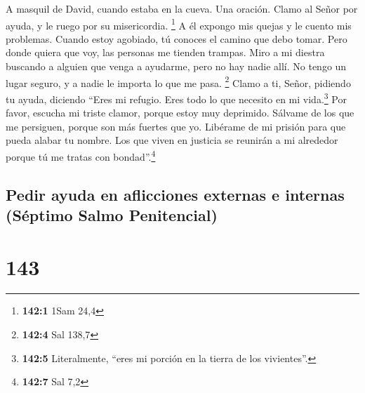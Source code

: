 A masquil de David, cuando estaba en la cueva. Una oración.
 Clamo al Señor por ayuda, y le ruego por su misericordia.
\footnote{\textbf{142:1} 1Sam 24,4}  A él expongo mis
quejas y le cuento mis problemas.  Cuando estoy agobiado,
tú conoces el camino que debo tomar. Pero donde quiera que voy, las
personas me tienden trampas.  Miro a mi diestra buscando a
alguien que venga a ayudarme, pero no hay nadie allí. No tengo un lugar
seguro, y a nadie le importa lo que me pasa. \footnote{\textbf{142:4}
  Sal 138,7}  Clamo a ti, Señor, pidiendo tu ayuda,
diciendo ``Eres mi refugio. Eres todo lo que necesito en mi
vida.\footnote{\textbf{142:5} Literalmente, ``eres mi porción en la
  tierra de los vivientes''.}  Por favor, escucha mi
triste clamor, porque estoy muy deprimido. Sálvame de los que me
persiguen, porque son más fuertes que yo.  Libérame de mi
prisión para que pueda alabar tu nombre. Los que viven en justicia se
reunirán a mi alrededor porque tú me tratas con bondad''.\footnote{\textbf{142:7}
  Sal 7,2}

\hypertarget{pedir-ayuda-en-aflicciones-externas-e-internas-suxe9ptimo-salmo-penitencial}{%
\subsection{Pedir ayuda en aflicciones externas e internas (Séptimo
Salmo
Penitencial)}\label{pedir-ayuda-en-aflicciones-externas-e-internas-suxe9ptimo-salmo-penitencial}}

\hypertarget{section-142}{%
\section{143}\label{section-142}}

